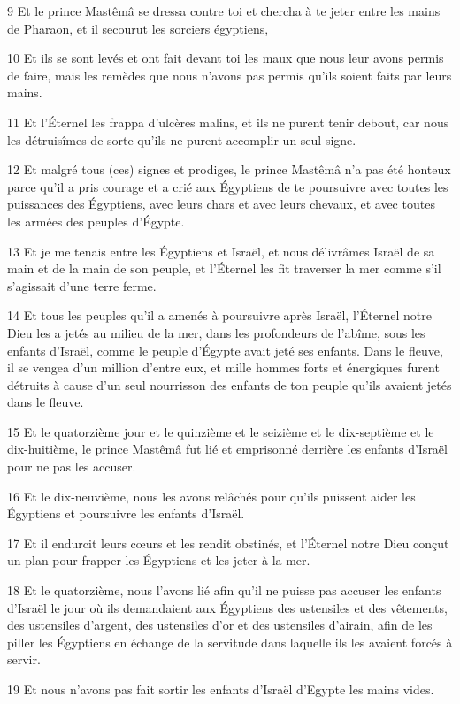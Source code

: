 \par 9 Et le prince Mastêmâ se dressa contre toi et chercha à te jeter entre les mains de Pharaon, et il secourut les sorciers égyptiens,
\par 10 Et ils se sont levés et ont fait devant toi les maux que nous leur avons permis de faire, mais les remèdes que nous n'avons pas permis qu'ils soient faits par leurs mains.
\par 11 Et l'Éternel les frappa d'ulcères malins, et ils ne purent tenir debout, car nous les détruisîmes de sorte qu'ils ne purent accomplir un seul signe.
\par 12 Et malgré tous (ces) signes et prodiges, le prince Mastêmâ n'a pas été honteux parce qu'il a pris courage et a crié aux Égyptiens de te poursuivre avec toutes les puissances des Égyptiens, avec leurs chars et avec leurs chevaux, et avec toutes les armées des peuples d'Égypte.
\par 13 Et je me tenais entre les Égyptiens et Israël, et nous délivrâmes Israël de sa main et de la main de son peuple, et l'Éternel les fit traverser la mer comme s'il s'agissait d'une terre ferme.
\par 14 Et tous les peuples qu'il a amenés à poursuivre après Israël, l'Éternel notre Dieu les a jetés au milieu de la mer, dans les profondeurs de l'abîme, sous les enfants d'Israël, comme le peuple d'Égypte avait jeté ses enfants. Dans le fleuve, il se vengea d'un million d'entre eux, et mille hommes forts et énergiques furent détruits à cause d'un seul nourrisson des enfants de ton peuple qu'ils avaient jetés dans le fleuve.
\par 15 Et le quatorzième jour et le quinzième et le seizième et le dix-septième et le dix-huitième, le prince Mastêmâ fut lié et emprisonné derrière les enfants d'Israël pour ne pas les accuser.
\par 16 Et le dix-neuvième, nous les avons relâchés pour qu'ils puissent aider les Égyptiens et poursuivre les enfants d'Israël.
\par 17 Et il endurcit leurs cœurs et les rendit obstinés, et l'Éternel notre Dieu conçut un plan pour frapper les Égyptiens et les jeter à la mer.
\par 18 Et le quatorzième, nous l'avons lié afin qu'il ne puisse pas accuser les enfants d'Israël le jour où ils demandaient aux Égyptiens des ustensiles et des vêtements, des ustensiles d'argent, des ustensiles d'or et des ustensiles d'airain, afin de les piller les Égyptiens en échange de la servitude dans laquelle ils les avaient forcés à servir.
\par 19 Et nous n'avons pas fait sortir les enfants d'Israël d'Egypte les mains vides.

